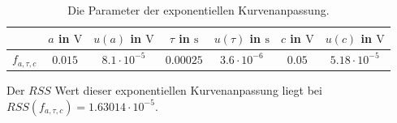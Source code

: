 \documentclass[../../main.tex]{subfiles}
\begin{document}
    \begin{table}[H]
        \centering
        \begin{tabular}{c|cc|cc|cc}
            \hline
             & $a$ in $\si{\volt}$ & $u(a)$ in $\si{\volt}$ & $\tau$ in $\si{\s}$ & $u(\tau)$ in $\si{\s}$ & $c$ in $\si{\volt}$ & $u(c)$ in $\si{\volt}$ \\
            \hline\hline
            $f_{a,\tau,c}$ & $0.015$ & $8.1\cdot 10^{-5}$ & $0.00025$ & $3.6\cdot 10^{-6}$ & $0.05$ & $5.18\cdot 10^{-5}$ \\
            \hline
        \end{tabular}
        \caption{Die Parameter der exponentiellen Kurvenanpassung.}
        \label{tab:2-spontaneEmissionDataTExpFit}
    \end{table}
    Der $RSS$ Wert dieser exponentiellen Kurvenanpassung liegt bei $RSS(f_{a,\tau,c}) = 1.63014\cdot 10^{-5}$.
\end{document}
